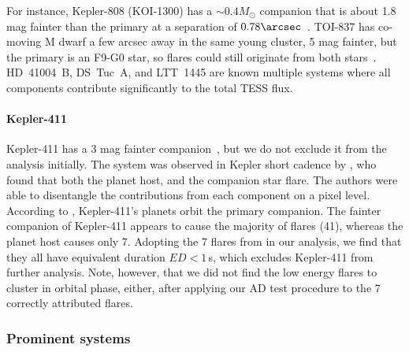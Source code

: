 \documentclass[twocolumn]{aastex631}
\begin{document}
For instance, Kepler-808 (KOI-1300) has a $\sim0.4M_\odot$ \citep{kraus2016impact} companion that is about 1.8 mag fainter than the primary at a separation of $0.78\arcsec$~\citep{baranec2016roboao}. TOI-837 has co-moving M dwarf a few arcsec away in the same young cluster, 5 mag fainter, but the primary is an F9-G0 star, so flares could still originate from both stars~\citep{bouma2020cluster}. HD~41004~B, DS~Tuc~A, and LTT~1445 are known multiple systems where all components contribute significantly to the total TESS flux.


\paragraph{Kepler-411}
\label{sec:results:individualstars:kep411}
Kepler-411 has a 3 mag fainter companion~\citep{wang2014influence,ziegler2018measuring}, but we do not exclude it from the analysis initially. The system was observed in Kepler short cadence by \citet{jackman2021stellara}, who found that both the planet host, and the companion star flare. The authors were able to disentangle the contributions from each component on a pixel level. According to \citet{morton2016false, sun2019kepler411}, Kepler-411's planets orbit the primary companion. The fainter companion of Kepler-411 appears to cause the majority of flares (41), whereas the planet host causes only 7. Adopting the 7 flares from \cite{jackman2021stellara} in our analysis, we find that they all have equivalent duration $ED<1\,$s, which excludes Kepler-411 from further analysis. Note, however, that we did not find the low energy flares to cluster in orbital phase, either, after applying our AD test procedure to the 7 correctly attributed flares.

\subsubsection{Prominent systems}
\label{sec:prominensystems}
\end{document}
